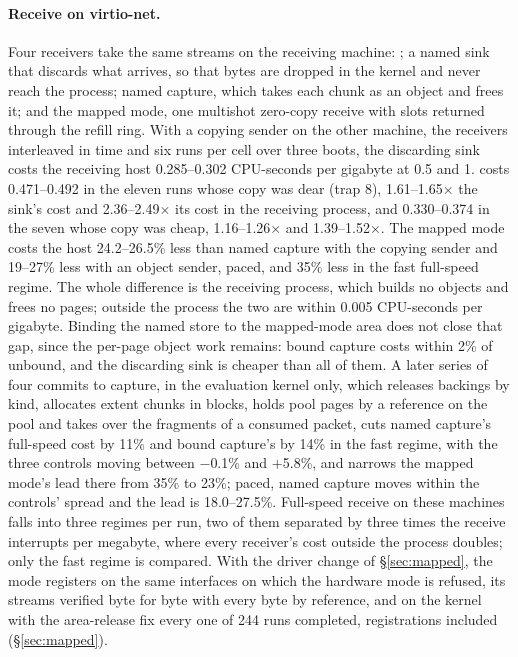 \paragraph{Receive on virtio-net.} Four receivers take the same streams on the receiving
machine: ; a named sink that discards what arrives, so that bytes are dropped in
the kernel and never reach the process; named capture, which takes each chunk as an object and
frees it; and the mapped mode, one multishot zero-copy receive with slots returned through the
refill ring. With a copying sender on the other machine, the receivers interleaved in time
and six runs per cell over three boots, the discarding sink costs the receiving host
0.285--0.302 CPU-seconds per gigabyte at 0.5 and 1\GBs.  costs 0.471--0.492 in
the eleven runs whose copy was dear (trap 8), 1.61--1.65$\times$ the sink's cost and
2.36--2.49$\times$ its cost in the receiving process, and 0.330--0.374 in the seven whose copy
was cheap, 1.16--1.26$\times$ and 1.39--1.52$\times$. %
The mapped mode costs the host 24.2--26.5\% less than named capture with the copying sender
and 19--27\% less with an object sender, paced, and 35\% less in the fast full-speed regime.
The whole difference is the receiving process, which builds no objects and frees no pages;
outside the process the two are within 0.005 CPU-seconds per gigabyte. Binding the named store
to the mapped-mode area does not close that gap, since the per-page object work remains: bound
capture costs within 2\% of unbound, and the discarding sink is cheaper than all of them.
A later series of four commits to capture, in the evaluation kernel only, which releases
backings by kind, allocates extent chunks in blocks, holds pool pages by a reference on the
pool and takes over the fragments of a consumed packet, cuts named capture's full-speed cost by
11\% and bound capture's by 14\% in
the fast regime, with the three controls moving between $-$0.1\% and $+$5.8\%, and narrows the
mapped mode's lead there from 35\% to 23\%; paced, named capture moves within the controls'
spread and the lead is 18.0--27.5\%. %
Full-speed receive on these machines falls into three regimes per run, two of them separated
by three times the receive interrupts per megabyte, where every receiver's cost outside the
process doubles; only the fast regime is compared. With the driver change of
\S\ref{sec:mapped}, the mode registers on the same interfaces on which the hardware mode is
refused, its streams verified byte for byte with every byte by
reference, and on the kernel with the area-release fix every one of 244 runs completed,
registrations included (\S\ref{sec:mapped}). %

